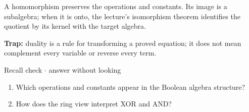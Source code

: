 \documentclass[11pt]{article}
\begin{document}
\begin{keepsection}
\begin{keepsection}
A homomorphism preserves the operations and constants. Its image is a subalgebra; when it is onto, the lecture’s isomorphism theorem identifies the quotient by its kernel with the target algebra.

\begin{notebox}\textbf{Trap:} duality is a rule for transforming a proved equation; it does not mean complement every variable or reverse every term.\end{notebox}

\begin{recallbox}{Recall check \ensuremath{\cdot} answer without looking}
\begin{enumerate}
\item Which operations and constants appear in the Boolean algebra structure?
\item How does the ring view interpret XOR and AND?
\end{enumerate}

\end{recallbox}
\end{keepsection}
\end{keepsection}
\end{document}
